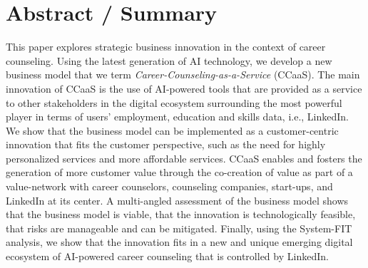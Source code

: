 \vspace*{3cm}

\section*{Abstract / Summary}

This paper explores strategic business innovation in the context of career counseling. Using
the latest generation of AI technology, we develop a new business model that we term
\textit{Career-Counseling-as-a-Service} (CCaaS). The main innovation of CCaaS is the use of AI-powered
tools that are provided as a service to other stakeholders in the digital ecosystem surrounding
the most powerful player in terms of users' employment, education and skills data, i.e., LinkedIn.
We show that the business model can be implemented as a customer-centric innovation that fits the
customer perspective, such as the need for highly personalized services and more affordable services.
CCaaS enables and fosters the generation of more customer value through the co-creation of value
as part of a value-network with career counselors, counseling companies, start-ups, and LinkedIn
at its center. A multi-angled assessment of the business model shows that the business model
is viable, that the innovation is technologically feasible, that risks are manageable and can
be mitigated. Finally, using the System-FIT analysis, we show that the innovation fits in
a new and unique emerging digital ecosystem of AI-powered career counseling that is controlled
by LinkedIn.
